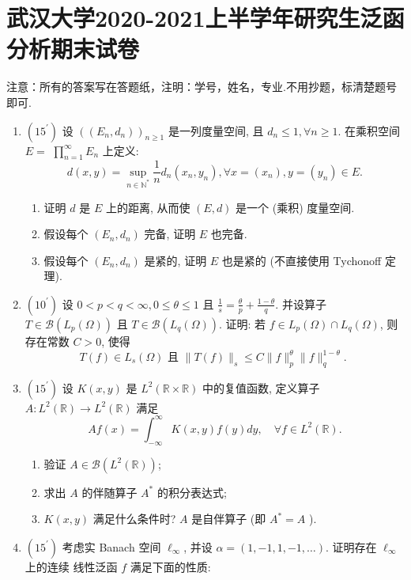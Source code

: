 \section{武汉大学2020-2021上半学年研究生泛函分析期末试卷}
注意：所有的答案写在答题纸，注明：学号，姓名，专业.不用抄题，标清楚题号即可.

\begin{enumerate}
  \item $\left(15^{\prime}\right)$ 设 $\left(\left(E_{n}, d_{n}\right)\right)_{n \geq 1}$ 是一列度量空间, 且 $d_{n} \leq 1, \forall n \geq 1$. 在乘积空间 $E=$ $\prod_{n=1}^{\infty} E_{n}$ 上定义:
  \[
    d(x, y)=\sup _{n \in \mathbb{N}^{*}} \frac{1}{n} d_{n}\left(x_{n}, y_{n}\right), \forall x=\left(x_{n}\right), y=\left(y_{n}\right) \in E .
  \]
    \begin{enumerate}
      \item 证明 $d$ 是 $E$ 上的距离, 从而使 $(E, d)$ 是一个 (乘积) 度量空间.
      \item 假设每个 $\left(E_{n}, d_{n}\right)$ 完备, 证明 $E$ 也完备.
      \item 假设每个 $\left(E_{n}, d_{n}\right)$ 是紧的, 证明 $E$ 也是紧的 (不直接使用 Tychonoff 定理).
    \end{enumerate}
  \item $\left(10^{\prime}\right)$ 设 $0<p<q<\infty, 0 \leq \theta \leq 1$ 且 $\frac{1}{s}=\frac{\theta}{p}+\frac{1-\theta}{q}$. 并设算子 $T \in \mathcal{B}\left(L_{p}(\Omega)\right)$ 且 $T \in \mathcal{B}\left(L_{q}(\Omega)\right)$. 证明: 若 $f \in L_{p}(\Omega) \cap L_{q}(\Omega)$, 则存在常数 $C>0$, 使得
  \[
    T(f) \in L_{s}(\Omega) \text { 且 }\|T(f)\|_{s} \leq C\|f\|_{p}^{\theta}\|f\|_{q}^{1-\theta} \text {. }
  \]
  \item $\left(15^{\prime}\right)$ 设 $K(x, y)$ 是 $L^{2}(\mathbb{R} \times \mathbb{R})$ 中的复值函数, 定义算子 $A: L^{2}(\mathbb{R}) \rightarrow L^{2}(\mathbb{R})$ 满足
  \[
    A f(x)=\int_{-\infty}^{\infty} K(x, y) f(y) d y, \quad \forall f \in L^{2}(\mathbb{R}) .
  \]
    \begin{enumerate}
      \item 验证 $A \in \mathcal{B}\left(L^{2}(\mathbb{R})\right)$;
      \item 求出 $A$ 的伴随算子 $A^{*}$ 的积分表达式;
      \item $K(x, y)$ 满足什么条件时? $A$ 是自伴算子 (即 $A^{*}=A$ ).
    \end{enumerate}
  \item $\left(15^{\prime}\right)$ 考虑实 Banach 空间 $\ell_{\infty}$, 并设 $\alpha=(1,-1,1,-1, \ldots)$. 证明存在 $\ell_{\infty}$ 上的连续 线性泛函 $f$ 满足下面的性质:

\end{enumerate}
